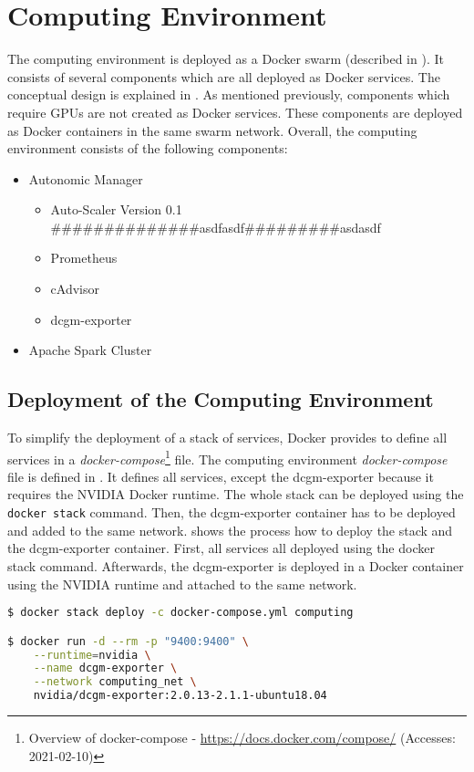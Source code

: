 \section{Computing Environment}
\label{sec:06_env}
The computing environment is deployed as a Docker swarm (described in ). It consists of several components which are all deployed as Docker services. The conceptual design is explained in .
As mentioned previously, components which require GPUs are not created as Docker services. These components are deployed as Docker containers in the same swarm network.
Overall, the computing environment consists of the following components:
\begin{itemize}
\item Autonomic Manager
\begin{itemize}
\item Auto-Scaler Version 0.1 ##############asdfasdf#########asdasdf
\item Prometheus
\item cAdvisor
\item dcgm-exporter
\end{itemize}

\item Apache Spark Cluster
\end{itemize}


\subsection{Deployment of the Computing Environment}
\label{subsec:06_env_depl} 
To simplify the deployment of a stack of services, Docker provides to define all services in a \textit{docker-compose}\footnote{Overview of docker-compose - \url{https://docs.docker.com/compose/} (Accesses: 2021-02-10)} file.
The computing environment \textit{docker-compose} file is defined in .
%
It defines all services, except the dcgm-exporter because it requires the NVIDIA Docker runtime.
%
The whole stack can be deployed using the \texttt{docker stack} command. Then, the dcgm-exporter container has to be deployed and added to the same network.
%
 shows the process how to deploy the stack and the dcgm-exporter container. First, all services all deployed using the docker stack command. Afterwards, the dcgm-exporter is deployed in a Docker container using the NVIDIA runtime and attached to the same network.
\begin{lstlisting}[label=lst:06_env_depl_docker-stack, caption=Auto-Scaler start command, language=sh, numbers=none]
$ docker stack deploy -c docker-compose.yml computing

$ docker run -d --rm -p "9400:9400" \
    --runtime=nvidia \
    --name dcgm-exporter \
    --network computing_net \
    nvidia/dcgm-exporter:2.0.13-2.1.1-ubuntu18.04
\end{lstlisting}


